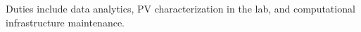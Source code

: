 \documentclass[10pt]{article}
\begin{document}
{    Duties include data analytics, PV characterization in the lab, and computational infrastructure maintenance. 
%	
	
}	
		
\end{document}
